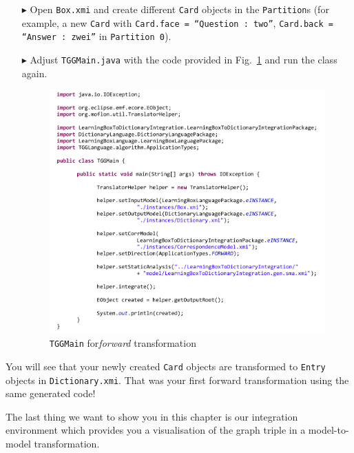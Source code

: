 \begin{enumerate}
\item[$\blacktriangleright$] Open \texttt{Box.xmi} and create different \texttt{Card} objects in the \texttt{Partition}s (for example, a new \texttt{Card} with \texttt{Card.face = ``Question : two''}, \texttt{Card.back = ``Answer : zwei''} in \texttt{Partition 0}). 

\item[$\blacktriangleright$] Adjust \texttt{TGGMain.java} with the code provided in Fig.~\ref{fig:tggmainforward} and run the class again.

\begin{figure}[htbp]
\begin{center}
  \includegraphics[width=\textwidth]{pics/tggBilder/transformation/tgg28}
  \caption{\texttt{TGGMain} for\emph{forward} transformation}  
  \label{fig:tggmainforward}
\end{center}
\end{figure} 

\end{enumerate}

You will see that your newly created \texttt{Card} objects are transformed to \texttt{Entry} objects in \texttt{Dictionary.xmi}.
That was your first forward transformation using the same generated code!

The last thing we want to show you in this chapter is our integration environment which provides you a visualisation of the graph triple in a model-to-model transformation.

